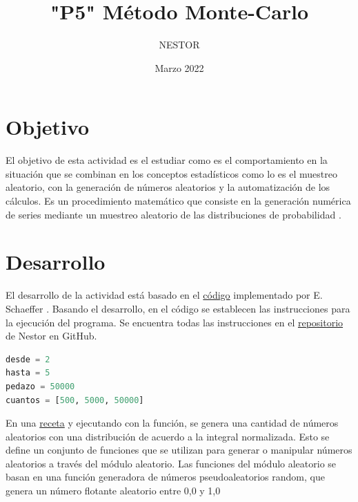 \documentclass{article}
\title{"P5" Método Monte-Carlo}
\author{NESTOR}
\date {Marzo 2022}
\begin{document}
\maketitle

\section{Objetivo}
El objetivo de esta actividad es el estudiar como es el comportamiento en la situación que se combinan en los conceptos estadísticos como lo es el muestreo aleatorio, con la generación de números aleatorios y la automatización de los cálculos. Es un procedimiento matemático que consiste en la generación numérica de series mediante un muestreo aleatorio de las distribuciones de probabilidad \cite{Matpltlib}.

\section{Desarrollo}
El desarrollo de la actividad est\'a basado en el \href{https://github.com/satuelisa/Simulation/blob/master/MonteCarlo/integral.py}{c\'odigo} implementado por E. Schaeffer \cite{1}. Basando el desarrollo, en el c\'odigo \cite{1} se establecen las instrucciones para la ejecuci\'on del programa. Se encuentra todas las instrucciones en el  \href{https://https://github.com/NestorZeus/SIMULACION-COMPUTACIONAL-DE-NANOMATERIALES/tree/main/P5}{repositorio} de Nestor en GitHub.\\

\begin{lstlisting}[caption=Ejecución de Par\'ametros, label=codigo1, language=Python]
desde = 2
hasta = 5
pedazo = 50000
cuantos = [500, 5000, 50000]
\end{lstlisting}

En una \href{https://github.com/satuelisa/Simulation/blob/master/MonteCarlo/GeneralRandom.py}{receta} y ejecutando con la funci\'on, se genera una cantidad de n\'umeros aleatorios con una distribuci\'on de acuerdo a la integral normalizada. Esto se define un conjunto de funciones que se utilizan para generar o manipular números aleatorios a través del módulo aleatorio. Las funciones del módulo aleatorio se basan en una función generadora de números pseudoaleatorios random, que genera un número flotante aleatorio entre 0,0 y 1,0 \cite{Matpltlib}
\end{document}
